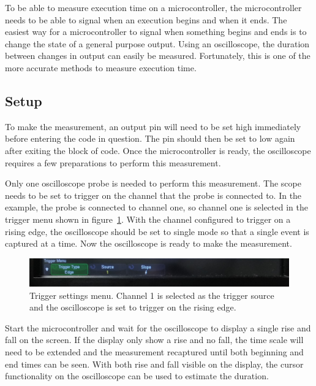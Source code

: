 \documentclass{article}
\begin{document}
  To be able to measure execution time on a microcontroller, the microcontroller
  needs to be able to signal when an execution begins and when it ends. The
  easiest way for a microcontroller to signal when something begins and ends is
  to change the state of a general purpose output. Using an oscilloscope, the
  duration between changes in output can easily be measured.  Fortunately, this
  is one of the more accurate methods to measure execution time.

  \subsection{Setup}

  To make the measurement, an output pin will need to be set high immediately
  before entering the code in question. The pin should then be set to low again
  after exiting the block of code. Once the microcontroller is ready, the
  oscilloscope requires a few preparations to perform this measurement.

  Only one oscilloscope probe is needed to perform this measurement. The scope
  needs to be set to trigger on the channel that the probe is connected to. In
  the example, the probe is connected to channel one, so channel one is selected
  in the trigger menu shown in figure~\ref{fig:exectime_trigger}. With the
  channel configured to trigger on a rising edge, the oscilloscope should be set
  to single mode so that a single event is captured at a time. Now the
  oscilloscope is ready to make the measurement.

  \begin{figure}[h]
    \includegraphics[width=\textwidth]{images/exec_time/trigger_menu.jpg}
    \caption{Trigger settings menu. Channel 1 is selected as the trigger source
      and the oscilloscope is set to trigger on the rising edge.}
    \label{fig:exectime_trigger}
  \end{figure}

  Start the microcontroller and wait for the oscilloscope to display a single
  rise and fall on the screen. If the display only show a rise and no fall, the
  time scale will need to be extended and the measurement recaptured until both
  beginning and end times can be seen. With both rise and fall visible on the
  display, the cursor functionality on the oscilloscope can be used to estimate
  the duration.
\end{document}
